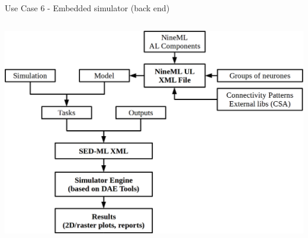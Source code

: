 \documentclass[compress,newPxFont,sthlmFooter]{beamer}
\begin{document}
\begin{frame}[plain]{Use Case 6 - Embedded simulator (back end)}
\begin{columns}[c]
      \begin{column}{0.45\paperwidth}
        \begin{center}
            \includegraphics[align=c, width=\textwidth]{nineml_ris.png}
        \end{center}
      \end{column}
    \end{columns}
\end{frame}
\end{document}
